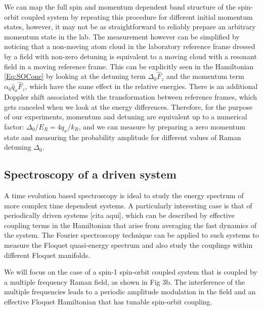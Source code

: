 We can map the full spin and momentum dependent band structure of the spin-orbit coupled system by repeating this procedure for different initial momentum states, however, it may not be as straightforward to reliably prepare an arbitrary momentum state in the lab. The measurement however can be simplified by noticing that a non-moving atom cloud in the laboratory reference frame dressed by a field with non-zero detuning is equivalent to a moving cloud with a resonant field in a moving reference frame. This can be explicitly seen in the Hamiltonian \ref{Eq:SOCone} by looking at the detuning term $\Delta_0\hat{F}_z$ and the momentum term $\alpha_0\hat{q}_x\hat{F}_z$, which have the same effect in the relative energies. There is an additional Doppler shift associated with the transformation between reference frames, which gets canceled when we look at the energy differences. Therefore, for the purpose of our experiments, momentum and detuning are equivalent up to a numerical factor: $\Delta_0/E_R=4q_x/k_R$, and we can measure by preparing a zero momentum state and measuring the probability amplitude for different values of Raman detuning $\Delta_0$. 


\subsection{Spectroscopy of a driven system}

A time evolution based spectroscopy is ideal to study the energy spectrum of more complex time dependent systems. A particularly interesting case is that of periodically driven systems [cita aqui], which can be described by effective coupling terms in the Hamiltonian that arise from averaging the fast dynamics of the system. The Fourier spectroscopy technique can be applied to such systems to measure the Floquet quasi-energy spectrum and also study the couplings within different Floquet manifolds. 

We will focus on the case of a spin-1 spin-orbit coupled system that is coupled by a multiple frequency Raman field, as shown in Fig 3b. The interference of the multiple frequencies leads to a periodic amplitude modulation in the field and an effective Floquet Hamiltonian that has tunable spin-orbit coupling. 


